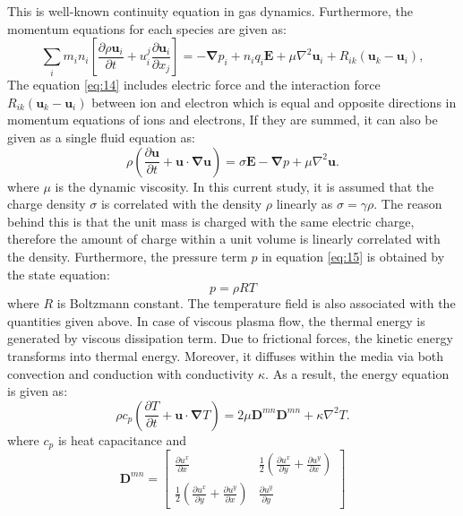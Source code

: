 \documentclass[12pt]{report}
\begin{document}
This is well-known continuity equation in gas dynamics. Furthermore, the momentum equations for each species are given as\cite{hakimphd}:
\begin{equation}
\label{eq:14}
 \sum_{i} m_i n_i \left [\frac{\partial \rho \mathbf{u}_i}{\partial t}+ u_{i}^{j}\frac{\partial \mathbf{u}_i}{\partial x_j}    \right ]=-\mathbf{\nabla}p_i+n_i q_i \mathbf{E}+\mu \nabla^2 \mathbf{u}_i+R_{ik}(\mathbf{u}_k-\mathbf{u}_i),
\end{equation}
The equation \ref{eq:14} includes electric force and the interaction force $R_{ik}(\mathbf{u}_k-\mathbf{u}_i)$ \cite{IntPlasma} between ion and electron which is equal and opposite directions in momentum equations of ions and electrons, If they are summed, it can also be given as a single fluid equation as:
\begin{equation}
\label{eq:15}
\rho \left ( \frac{\partial \mathbf{u}}{\partial t}+ \mathbf{u}\cdot \mathbf{\nabla}\mathbf{u} \right )=\sigma \mathbf{E}-\mathbf{\nabla}p +\mu \nabla^2 \mathbf{u}.
\end{equation}
where $\mu$ is the dynamic viscosity. In this current study, it is assumed that the charge density $\sigma$ is correlated with the density $\rho$ linearly as $\sigma=\gamma \rho$. The reason behind this is that the unit mass is charged with the same electric charge, therefore the amount of charge within a unit volume is linearly correlated with the density. Furthermore, the pressure term $p$ in equation \ref{eq:15} is obtained by the state equation:
\begin{equation}
\label{eq:16}
p=\rho R T
\end{equation}  
where $R$ is Boltzmann constant. The temperature field is also associated with the quantities given above. In case of viscous plasma flow, the thermal energy is generated by viscous dissipation term. Due to frictional forces, the kinetic energy transforms into thermal energy. Moreover, it diffuses within the media via both convection and conduction with conductivity $\kappa$. As a result, the energy equation \cite{IntPlasma} is given as:
\begin{equation}
\label{eq:3}
\rho c_{p} \left ( \frac{\partial T}{\partial t}+\mathbf{u} \cdot \mathbf{\nabla} T\right )=2\mu \mathbf{D}^{mn}\mathbf{D}^{mn}+\kappa \nabla^2 T.
\end{equation}
where  $c_{p}$ is heat capacitance and
\begin{equation}
\label{eq:4}
\mathbf{D}^{mn}=
\begin{bmatrix}
\frac{\partial u^{x}}{\partial x} & \frac{1}{2}(\frac{\partial u^{x}}{\partial y}+\frac{\partial u^{y}}{\partial x}) \\ 
\frac{1}{2}(\frac{\partial u^{x}}{\partial y}+\frac{\partial u^{y}}{\partial x}) & \frac{\partial u^{y}}{\partial y} 
\end{bmatrix}
\end{equation}
\end{document}
